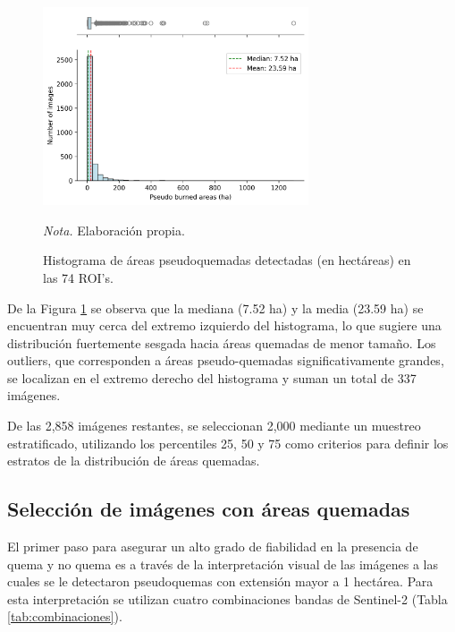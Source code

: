 \begin{figure}[H]
    \centering
    \caption{Histograma de áreas pseudoquemadas detectadas (en hectáreas)  en las 74 ROI's.}
    \includegraphics[width=0.7\textwidth]{img/6_metodologia/boxplot_burning.png}
    \label{fig:percentage_burning}
    \begin{flushleft}
        \vspace{-\baselineskip}
        \textit{Nota.} Elaboración propia.        
        \vspace{-\baselineskip}
    \end{flushleft}
\end{figure}

De la Figura \ref{fig:percentage_burning} se observa que la mediana (7.52 ha) y la media (23.59 ha) se encuentran muy cerca del extremo izquierdo del histograma, lo que sugiere una distribución fuertemente sesgada hacia áreas quemadas de menor tamaño. Los outliers, que corresponden a áreas pseudo-quemadas 
significativamente grandes, se localizan en el extremo derecho del histograma y suman un total de 337 imágenes.  

De las 2,858 imágenes restantes, se seleccionan 2,000 mediante un muestreo estratificado, utilizando los percentiles 25, 50 y 75 como criterios para definir los estratos de la distribución 
de áreas quemadas.

\subsection{Selección de imágenes con áreas quemadas}
\label{sec:seleccion_imagenes}
El primer paso para asegurar un alto grado de fiabilidad en la presencia de quema y no quema es a través de la interpretación visual de las imágenes a las cuales se le detectaron pseudoquemas con extensión mayor a 1 hectárea.
Para esta interpretación se utilizan cuatro combinaciones bandas de Sentinel-2 (Tabla \ref{tab:combinaciones}). 


